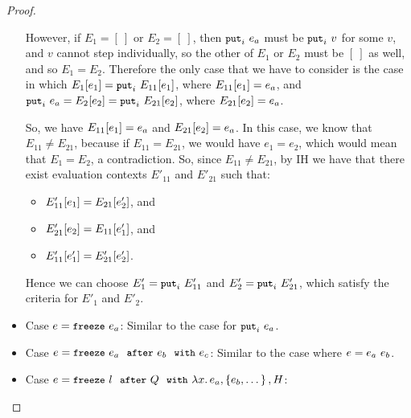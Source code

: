 \begin{proof}
\begin{itemize}
      However, if $E_1 = [~]$ or $E_2 = [~]$, then $\mbox{\small{\texttt{put}}}_i~e_a$
      must be $\mbox{\small{\texttt{put}}}_i~v$ for some $v$, and $v$ cannot step
      individually, so the other of $E_1$ or $E_2$ must be $[~]$ as
      well, and so $E_1 = E_2$.  Therefore the only case that we have
      to consider is the case in which $E_1\hspace{-0.5mm}\left[e_1\right] =
      \mbox{\small{\texttt{put}}}_i~E_{11}\hspace{-0.5mm}\left[e_1\right]$, where $E_{11}\hspace{-0.5mm}\left[e_1\right]
      = e_a$, and $\mbox{\small{\texttt{put}}}_i~e_a = E_2\hspace{-0.5mm}\left[e_2\right] =
      \mbox{\small{\texttt{put}}}_i~E_{21}\hspace{-0.5mm}\left[e_2\right]$, where $E_{21}\hspace{-0.5mm}\left[e_2\right]
      = e_a$.

      So, we have $E_{11}\hspace{-0.5mm}\left[e_1\right] = e_a$ and
      $E_{21}\hspace{-0.5mm}\left[e_2\right] = e_a$.  In this case, we know that
      $E_{11} \neq E_{21}$, because if $E_{11} = E_{21}$, we would
      have $e_1 = e_2$, which would mean that $E_1 = E_2$, a
      contradiction.  So, since $E_{11} \neq E_{21}$, by IH we have
      that there exist evaluation contexts $E'_{11}$ and $E'_{21}$
      such that:
      \begin{itemize}
      \item $E'_{11}\hspace{-0.5mm}\left[e_1\right] = E_{21}\hspace{-0.5mm}\left[e'_2\right]$, and
      \item $E'_{21}\hspace{-0.5mm}\left[e_2\right] = E_{11}\hspace{-0.5mm}\left[e'_1\right]$, and
      \item $E'_{11}\hspace{-0.5mm}\left[e'_1\right] = E'_{21}\hspace{-0.5mm}\left[e'_2\right]$.
      \end{itemize}

      Hence we can choose $E'_1 = \mbox{\small{\texttt{put}}}_i~E'_{11}$ and $E'_2 =
      \mbox{\small{\texttt{put}}}_i~E'_{21}$, which satisfy the criteria for $E'_1$ and
      $E'_2$.

    \item Case $e = \mbox{\small{\texttt{freeze}}}~e_a$: Similar to the case for $\mbox{\small{\texttt{put}}}_i~e_a$.

    \item Case $e = \mbox{\small{\texttt{freeze}}}~e_a~~{\mbox{\small{\texttt{after}}}}~e_b~~{\mbox{\small{\texttt{with}}}}~e_c$: Similar to the case
      where $e = e_a~e_b$.

    \item Case $e = \mbox{\small{\texttt{freeze}}}~l~~{\mbox{\small{\texttt{after}}}}~Q~~{\mbox{\small{\texttt{with}}}}~\lambda x.\,e_a, \left\{e_b,
        \dots\right\}, H$: 

  \end{itemize}
\end{proof}
